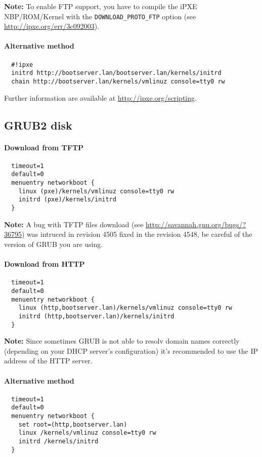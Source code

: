 \documentclass[a4paper,11pt]{article}
\begin{document}
\textbf{Note:} To enable FTP support, you have to compile the iPXE NBP/ROM/Kernel with the \texttt{DOWNLOAD\_PROTO\_FTP} option (see \url{http://ipxe.org/err/3c092003}).

\paragraph{Alternative method}
\begin{verbatim}
  #!ipxe
  initrd http://bootserver.lan/bootserver.lan/kernels/initrd
  chain http://bootserver.lan/kernels/vmlinuz console=tty0 rw
\end{verbatim}
\hrulefill

Further information are available at \url{http://ipxe.org/scripting}.

\subsection{GRUB2 disk}
\paragraph{Download from TFTP}
\begin{verbatim}
  timeout=1
  default=0
  menuentry networkboot {
    linux (pxe)/kernels/vmlinuz console=tty0 rw
    initrd (pxe)/kernels/initrd
  }
\end{verbatim}

\textbf{Note:} A bug with TFTP files download (see \url{http://savannah.gnu.org/bugs/?36795}) was intruced in revision 4505 fixed in the revision 4548, be careful of the version of GRUB you are using.

\paragraph{Download from HTTP}
\begin{verbatim}
  timeout=1
  default=0
  menuentry networkboot {
    linux (http,bootserver.lan)/kernels/vmlinuz console=tty0 rw
    initrd (http,bootserver.lan)/kernels/initrd
  }
\end{verbatim}

\textbf{Note:} Since sometimes GRUB is not able to resolv domain names correctly (depending on your DHCP server's configuration) it's recommended to use the IP address of the HTTP server.

\paragraph{Alternative method}
\begin{verbatim}
  timeout=1
  default=0
  menuentry networkboot {
    set root=(http,bootserver.lan)
    linux /kernels/vmlinuz console=tty0 rw
    initrd /kernels/initrd
  }
\end{verbatim}
\hrulefill
\end{document}
